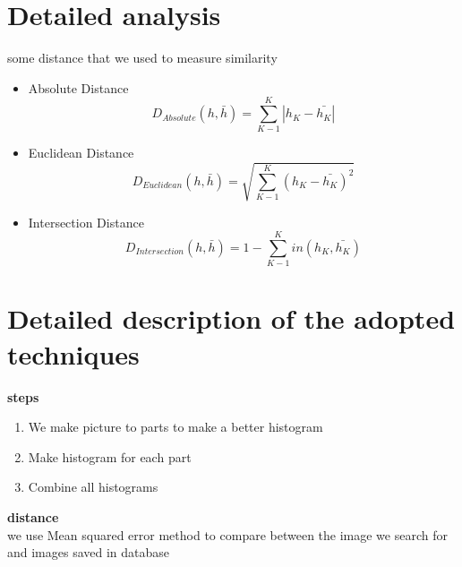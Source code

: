 \documentclass[pdftex,10pt,a4paper,oneside]{article}
\begin{document}
	
	\pagebreak
	\section{Detailed analysis}


some distance that we used to measure similarity 
\begin{itemize}
	\item Absolute Distance \\
	\begin{equation}
		D_{Absolute}(h,\bar{h})= \sum_{K-1}^{K} |h_{K}-\bar{h_{K}}|
	\end{equation}
	\item Euclidean Distance \\
	\begin{equation}
		D_{Euclidean}(h,\bar{h})= \sqrt{\sum_{K-1}^{K} (h_{K}-\bar{h_{K}})^{2}}
	\end{equation}
	\item Intersection Distance \\
	\begin{equation}
	D_{Intersection}(h,\bar{h})= 1- \sum_{K-1}^{K} in(h_{K},\bar{h_{K}})
	\end{equation}
	
	
	
\end{itemize}


	
	\pagebreak
	\section{Detailed description of the adopted techniques }
	
	
	
		\textbf{{\large steps}}\\
		\begin{enumerate}
			\item We make picture to parts to make a better histogram
			\item Make histogram for each part
			\item Combine all histograms 
		\end{enumerate}







	
	\textbf{{\large distance}}\\
	we use Mean squared error method to compare between the image we search for and images saved in database 
	
	\pagebreak
\end{document}
